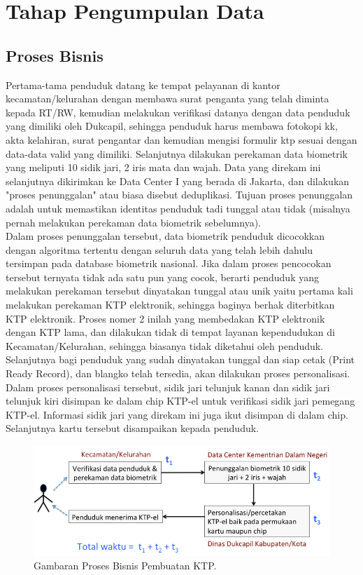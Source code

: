 
\chapter{Tahap Pengumpulan Data}

\section{Proses Bisnis}

	Pertama-tama penduduk datang ke tempat pelayanan di kantor kecamatan/kelurahan dengan  membawa surat penganta yang telah diminta kepada RT/RW, kemudian melakukan verifikasi datanya dengan data penduduk yang dimiliki oleh Dukcapil, sehingga penduduk harus membawa fotokopi kk, akta kelahiran, surat pengantar dan kemudian mengisi formulir ktp sesuai dengan data-data valid yang dimiliki. Selanjutnya dilakukan perekaman data biometrik yang meliputi 10 sidik jari, 2 iris mata dan wajah. Data yang direkam ini selanjutnya dikirimkan ke Data Center I yang berada di Jakarta, dan dilakukan "proses penunggalan" atau biasa disebut deduplikasi. Tujuan proses penunggalan adalah untuk memastikan identitas penduduk tadi tunggal atau tidak (misalnya pernah melakukan perekaman data biometrik sebelumnya).\\

	Dalam proses penunggalan tersebut, data biometrik penduduk dicocokkan dengan algoritma tertentu dengan seluruh data yang telah lebih dahulu tersimpan pada database biometrik nasional. Jika dalam proses pencocokan tersebut ternyata tidak ada satu pun yang cocok, berarti penduduk yang melakukan perekaman tersebut dinyatakan tunggal atau unik yaitu pertama kali melakukan perekaman KTP elektronik, sehingga baginya berhak diterbitkan KTP elektronik. Proses nomer 2 inilah yang membedakan KTP elektronik dengan KTP lama, dan dilakukan tidak di tempat layanan kependudukan di Kecamatan/Kelurahan, sehingga biasanya tidak diketahui oleh penduduk.\\

	Selanjutnya bagi penduduk yang sudah dinyatakan tunggal dan siap cetak (Print Ready Record), dan blangko telah tersedia, akan dilakukan proses personalisasi. Dalam proses personalisasi tersebut, sidik jari telunjuk kanan dan sidik jari telunjuk kiri disimpan ke dalam chip KTP-el untuk verifikasi sidik jari pemegang KTP-el. Informasi sidik jari yang direkam ini juga ikut disimpan di dalam chip.  Selanjutnya kartu tersebut disampaikan kepada penduduk.
\begin{figure}[H]
	\centering
	\includegraphics[width=12cm]{figures/probis.png}
	\caption{Gambaran Proses Bisnis Pembuatan KTP.}	
\end{figure}

